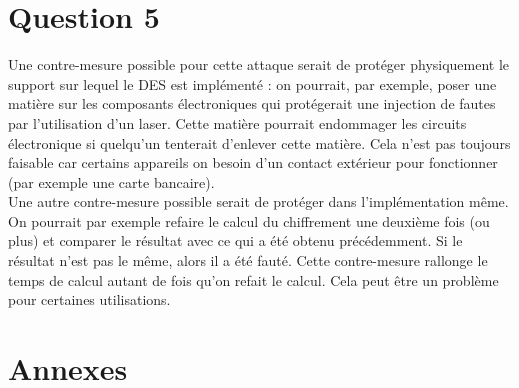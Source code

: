 \documentclass[10pt,a4paper]{article}
\begin{document}
\section{Question 5}
Une contre-mesure possible pour cette attaque serait de protéger physiquement le support sur lequel le DES est implémenté : on pourrait, par exemple, poser une matière sur les composants électroniques qui protégerait une injection de fautes par l'utilisation d'un laser. Cette matière pourrait endommager les circuits électronique si quelqu'un tenterait d'enlever cette matière. Cela n'est pas toujours faisable car certains appareils on besoin d'un contact extérieur pour fonctionner (par exemple une carte bancaire).\\
Une autre contre-mesure possible serait de protéger dans l'implémentation même. On pourrait par exemple refaire le calcul du chiffrement une deuxième fois (ou plus) et comparer le résultat avec ce qui a été obtenu précédemment. Si le résultat n'est pas le même, alors il a été fauté. Cette contre-mesure rallonge le temps de calcul autant de fois qu'on refait le calcul. Cela peut être un problème pour certaines utilisations.





\appendix
\newpage
\section{Annexes}
\end{document}
